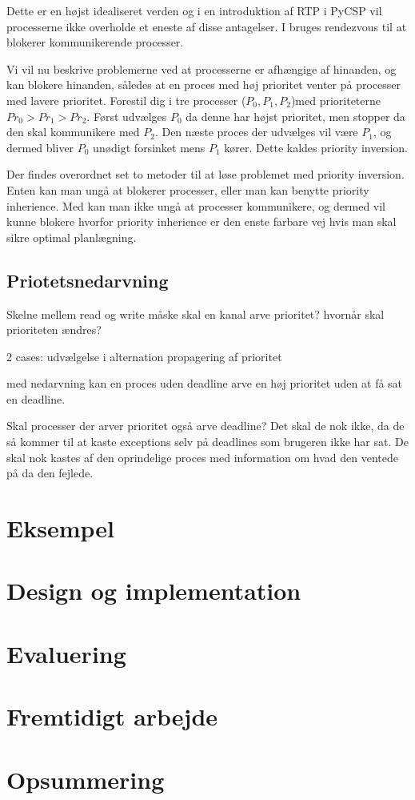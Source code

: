 Dette er en højst idealiseret verden og i en introduktion af RTP i PyCSP vil processerne ikke overholde et eneste af disse antagelser. 
I \pycsp bruges rendezvous til at blokerer kommunikerende  processer.

Vi vil nu beskrive problemerne ved at processerne er afhængige af hinanden, og kan blokere hinanden, således at en proces med høj prioritet venter på processer med lavere prioritet. Forestil dig i \pycsp tre processer ($P_0,P_1,P_2$)med prioriteterne $Pr_0>Pr_1>Pr_2$. Først udvælges $P_0$ da denne har højst prioritet, men stopper da den skal kommunikere med $P_2$. Den næste proces der udvælges vil være $P_1$, og dermed bliver $P_0$ unødigt forsinket mens $P_1$ kører. Dette kaldes priority inversion\cite{sha1990priority}.

Der findes overordnet set to metoder til at løse problemet med priority inversion. Enten kan man ungå at blokerer processer, eller man kan benytte priority inherience\cite{sha1990priority}. Med \pycsp kan man ikke ungå at processer kommunikere, og dermed vil kunne blokere hvorfor priority inherience er den enste farbare vej hvis man skal sikre optimal planlægning.

\subsection{Priotetsnedarvning}
Skelne mellem read og write
måske skal en kanal arve prioritet?
hvornår skal prioriteten ændres? 

2 cases:
udvælgelse i alternation
propagering af prioritet

med nedarvning kan en proces uden deadline arve en høj prioritet uden at få sat en deadline. 

Skal processer der arver prioritet også arve deadline? Det skal de nok ikke, da de så kommer til at kaste exceptions selv på deadlines som brugeren ikke har sat. De skal nok kastes af den oprindelige proces med information om hvad den ventede på da den fejlede. 

  \section{Eksempel}
  \section{Design og implementation}
  \section{Evaluering}
  \section{Fremtidigt arbejde}
  \section{Opsummering}

